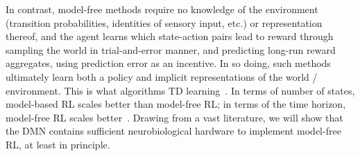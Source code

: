 \documentclass[10pt,letterpaper]{article}
\begin{document}
In contrast, model-free methods require no knowledge of the environment (transition probabilities, identities of sensory input, etc.) or representation thereof, and the agent learns which state-action pairs lead to reward through sampling the world in trial-and-error manner, and predicting long-run reward aggregates, using prediction error as an incentive. In so doing, such methods ultimately learn both a policy and  implicit representations of the world / environment. This is what algorithms TD learning~\citep{sutton1998reinforcement}. In terms of number of states, model-based RL scales better than model-free RL; in terms of the time horizon, model-free RL scales better~\citep{strehl2006}. Drawing from a vast literature, we will show that the DMN contains sufficient neurobiological hardware to implement model-free RL, at least in principle.
\end{document}
